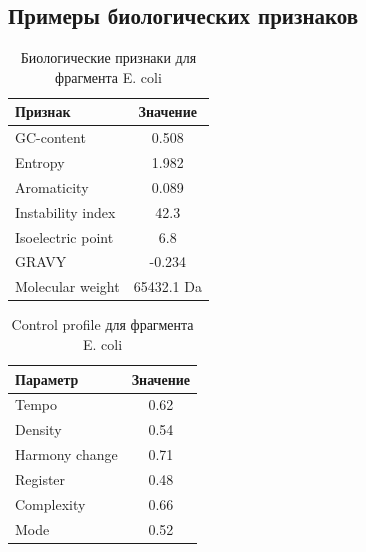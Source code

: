 \subsection{Примеры биологических признаков}

\begin{table}[htbp]
\centering
\caption{Биологические признаки для фрагмента E. coli}
\begin{tabular}{|l|c|}
\hline
\textbf{Признак} & \textbf{Значение} \\
\hline
GC-content & 0.508 \\
Entropy & 1.982 \\
Aromaticity & 0.089 \\
Instability index & 42.3 \\
Isoelectric point & 6.8 \\
GRAVY & -0.234 \\
Molecular weight & 65432.1 Da \\
\hline
\end{tabular}
\end{table}

\begin{table}[htbp]
\centering
\caption{Control profile для фрагмента E. coli}
\begin{tabular}{|l|c|}
\hline
\textbf{Параметр} & \textbf{Значение} \\
\hline
Tempo & 0.62 \\
Density & 0.54 \\
Harmony change & 0.71 \\
Register & 0.48 \\
Complexity & 0.66 \\
Mode & 0.52 \\
\hline
\end{tabular}
\end{table}
